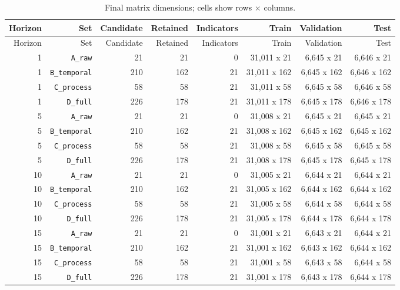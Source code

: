 \documentclass[10pt,a4paper]{article}
\begin{document}
\begin{landscape}\footnotesize\begin{longtable}{rrr r r rrr}\caption{Final matrix dimensions; cells show rows $\times$ columns.}\\\toprule Horizon & Set & Candidate & Retained & Indicators & Train & Validation & Test \\\midrule\endfirsthead\toprule Horizon & Set & Candidate & Retained & Indicators & Train & Validation & Test \\\midrule\endhead
1 & \nolinkurl{A_raw} & 21 & 21 & 0 & 31,011 x 21 & 6,645 x 21 & 6,646 x 21 \\
1 & \nolinkurl{B_temporal} & 210 & 162 & 21 & 31,011 x 162 & 6,645 x 162 & 6,646 x 162 \\
1 & \nolinkurl{C_process} & 58 & 58 & 21 & 31,011 x 58 & 6,645 x 58 & 6,646 x 58 \\
1 & \nolinkurl{D_full} & 226 & 178 & 21 & 31,011 x 178 & 6,645 x 178 & 6,646 x 178 \\
5 & \nolinkurl{A_raw} & 21 & 21 & 0 & 31,008 x 21 & 6,645 x 21 & 6,645 x 21 \\
5 & \nolinkurl{B_temporal} & 210 & 162 & 21 & 31,008 x 162 & 6,645 x 162 & 6,645 x 162 \\
5 & \nolinkurl{C_process} & 58 & 58 & 21 & 31,008 x 58 & 6,645 x 58 & 6,645 x 58 \\
5 & \nolinkurl{D_full} & 226 & 178 & 21 & 31,008 x 178 & 6,645 x 178 & 6,645 x 178 \\
10 & \nolinkurl{A_raw} & 21 & 21 & 0 & 31,005 x 21 & 6,644 x 21 & 6,644 x 21 \\
10 & \nolinkurl{B_temporal} & 210 & 162 & 21 & 31,005 x 162 & 6,644 x 162 & 6,644 x 162 \\
10 & \nolinkurl{C_process} & 58 & 58 & 21 & 31,005 x 58 & 6,644 x 58 & 6,644 x 58 \\
10 & \nolinkurl{D_full} & 226 & 178 & 21 & 31,005 x 178 & 6,644 x 178 & 6,644 x 178 \\
15 & \nolinkurl{A_raw} & 21 & 21 & 0 & 31,001 x 21 & 6,643 x 21 & 6,644 x 21 \\
15 & \nolinkurl{B_temporal} & 210 & 162 & 21 & 31,001 x 162 & 6,643 x 162 & 6,644 x 162 \\
15 & \nolinkurl{C_process} & 58 & 58 & 21 & 31,001 x 58 & 6,643 x 58 & 6,644 x 58 \\
15 & \nolinkurl{D_full} & 226 & 178 & 21 & 31,001 x 178 & 6,643 x 178 & 6,644 x 178 \\\bottomrule\end{longtable}\end{landscape}
\end{document}
